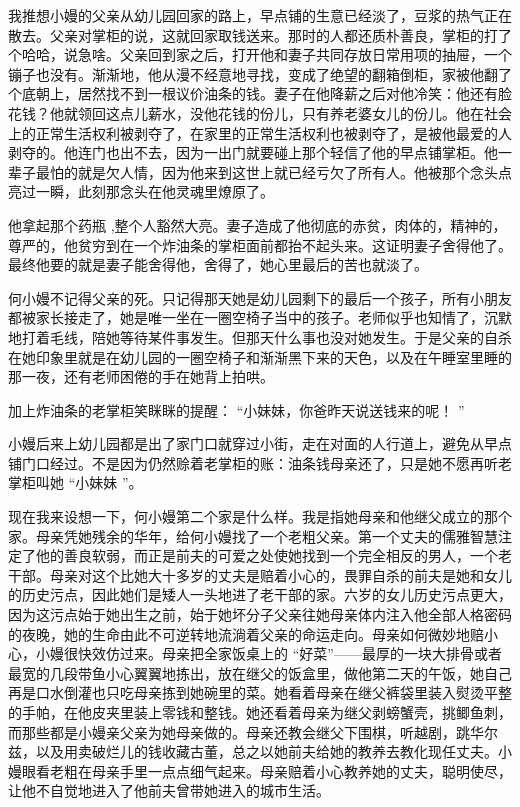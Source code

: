 \documentclass[12pt,twoside,openany]{book}
\begin{document}
我推想小嫚的父亲从幼儿园回家的路上，早点铺的生意已经淡了，豆浆的热气正在散去。父亲对掌柜的说，这就回家取钱送来。那时的人都还质朴善良，掌柜的打了个哈哈，说急啥。父亲回到家之后，打开他和妻子共同存放日常用项的抽屉，一个镚子也没有。渐渐地，他从漫不经意地寻找，变成了绝望的翻箱倒柜，家被他翻了个底朝上，居然找不到一根议价油条的钱。妻子在他降薪之后对他冷笑：他还有脸花钱？他就领回这点儿薪水，没他花钱的份儿，只有养老婆女儿的份儿。他在社会上的正常生活权利被剥夺了，在家里的正常生活权利也被剥夺了，是被他最爱的人剥夺的。他连门也出不去，因为一出门就要碰上那个轻信了他的早点铺掌柜。他一辈子最怕的就是欠人情，因为他来到这世上就已经亏欠了所有人。他被那个念头点亮过一瞬，此刻那念头在他灵魂里燎原了。

他拿起那个药瓶 ,整个人豁然大亮。妻子造成了他彻底的赤贫，肉体的，精神的，尊严的，他贫穷到在一个炸油条的掌柜面前都抬不起头来。这证明妻子舍得他了。最终他要的就是妻子能舍得他，舍得了，她心里最后的苦也就淡了。

何小嫚不记得父亲的死。只记得那天她是幼儿园剩下的最后一个孩子，所有小朋友都被家长接走了，她是唯一坐在一圈空椅子当中的孩子。老师似乎也知情了，沉默地打着毛线，陪她等待某件事发生。但那天什么事也没对她发生。于是父亲的自杀在她印象里就是在幼儿园的一圈空椅子和渐渐黑下来的天色，以及在午睡室里睡的那一夜，还有老师困倦的手在她背上拍哄。

加上炸油条的老掌柜笑眯眯的提醒： “小妹妹，你爸昨天说送钱来的呢！ ”

小嫚后来上幼儿园都是出了家门口就穿过小街，走在对面的人行道上，避免从早点铺门口经过。不是因为仍然赊着老掌柜的账：油条钱母亲还了，只是她不愿再听老掌柜叫她 “小妹妹 ”。

现在我来设想一下，何小嫚第二个家是什么样。我是指她母亲和他继父成立的那个家。母亲凭她残余的华年，给何小嫚找了一个老粗父亲。第一个丈夫的儒雅智慧注定了他的善良软弱，而正是前夫的可爱之处使她找到一个完全相反的男人，一个老干部。母亲对这个比她大十多岁的丈夫是赔着小心的，畏罪自杀的前夫是她和女儿的历史污点，因此她们是矮人一头地进了老干部的家。六岁的女儿历史污点更大，因为这污点始于她出生之前，始于她坏分子父亲往她母亲体内注入他全部人格密码的夜晚，她的生命由此不可逆转地流淌着父亲的命运走向。母亲如何微妙地赔小心，小嫚很快效仿过来。母亲把全家饭桌上的 “好菜”——最厚的一块大排骨或者最宽的几段带鱼小心翼翼地拣出，放在继父的饭盒里，做他第二天的午饭，她自己再是口水倒灌也只吃母亲拣到她碗里的菜。她看着母亲在继父裤袋里装入熨烫平整的手帕，在他皮夹里装上零钱和整钱。她还看着母亲为继父剥螃蟹壳，挑鲫鱼刺，而那些都是小嫚亲父亲为她母亲做的。母亲还教会继父下围棋，听越剧，跳华尔兹，以及用卖破烂儿的钱收藏古董，总之以她前夫给她的教养去教化现任丈夫。小嫚眼看老粗在母亲手里一点点细气起来。母亲赔着小心教养她的丈夫，聪明使尽，让他不自觉地进入了他前夫曾带她进入的城市生活。
\end{document}
